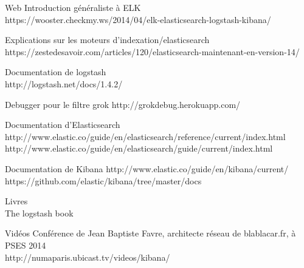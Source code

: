 Web
Introduction généraliste à ELK \\

https://wooster.checkmy.ws/2014/04/elk-elasticsearch-logstash-kibana/

Explications sur les moteurs d'indexation/elasticsearch\\
https://zestedesavoir.com/articles/120/elasticsearch-maintenant-en-version-14/



Documentation de logstash\\
http://logstash.net/docs/1.4.2/

Debugger pour le filtre grok
http://grokdebug.herokuapp.com/


Documentation d'Elasticsearch\\
http://www.elastic.co/guide/en/elasticsearch/reference/current/index.html\\
http://www.elastic.co/guide/en/elasticsearch/guide/current/index.html



Documentation de Kibana
http://www.elastic.co/guide/en/kibana/current/
https://github.com/elastic/kibana/tree/master/docs


Livres\\
The logstash book


Vidéos
Conférence de Jean Baptiste Favre, architecte réseau de blablacar.fr, à PSES 2014\\
http://numaparis.ubicast.tv/videos/kibana/
